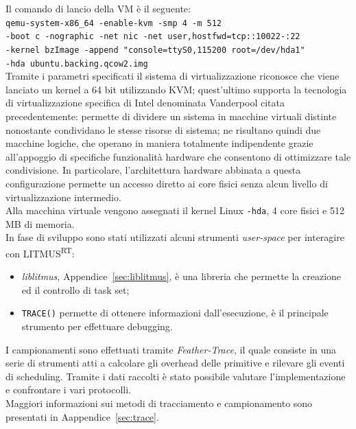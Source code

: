 \noindent Il comando di lancio della VM è il seguente:\\

\noindent \texttt{qemu-system-x86\_64 -enable-kvm -smp 4 -m 512 \\
-boot c -nographic -net nic -net user,hostfwd=tcp::10022-:22 \\
-kernel bzImage -append "console=ttyS0,115200 root=/dev/hda1" \\ 
-hda ubuntu.backing.qcow2.img}\\

\noindent Tramite i parametri specificati il sistema di virtualizzazione riconosce che viene lanciato un kernel a 64 bit utilizzando KVM; quest'ultimo supporta la tecnologia di virtualizzazione specifica di Intel denominata Vanderpool citata precedentemente: permette di dividere un sistema in macchine virtuali distinte nonostante condividano le stesse risorse di sistema; ne risultano quindi due macchine logiche, che operano in maniera totalmente indipendente grazie all'appoggio di specifiche funzionalità hardware che consentono di ottimizzare tale condivisione. In particolare, l'architettura hardware abbinata a questa configurazione permette un accesso diretto ai core fisici senza alcun livello di virtualizzazione intermedio.\\
Alla macchina virtuale vengono assegnati il kernel Linux \texttt{-hda}, 4 core fisici e 512 MB di memoria.\\

\noindent In fase di sviluppo sono stati utilizzati alcuni strumenti \textit{user-space} per interagire con LITMUS\textsuperscript{RT}:

\begin{itemize}
  \item \textit{liblitmus}, Appendice~\ref{sec:liblitmus}, è una libreria che permette la creazione ed il controllo di task set;
  \item \texttt{TRACE()} permette di ottenere informazioni dall'esecuzione, è il principale strumento per effettuare debugging.\\
\end{itemize}

\noindent I campionamenti sono effettuati tramite \textit{Feather-Trace}, il quale consiste in una serie di strumenti atti a calcolare gli overhead delle primitive e rilevare gli eventi di scheduling. Tramite i dati raccolti è stato possibile valutare l'implementazione e confrontare i vari protocolli.\\
Maggiori informazioni sui metodi di tracciamento e campionamento sono presentati in Aappendice~\ref{sec:trace}.\\

